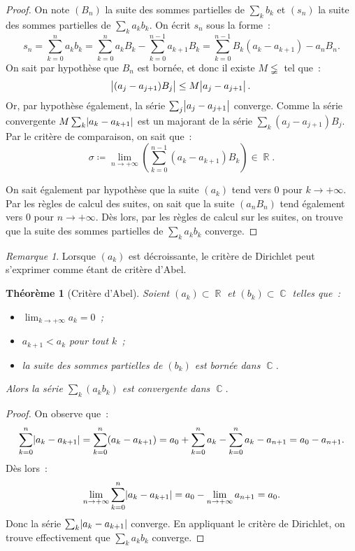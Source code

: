 \documentclass{article}
\DeclareMathOperator{\C}{\mathbb C}
\DeclareMathOperator{\R}{\mathbb R}
\newtheorem{thm}{Théorème}[section]
\theoremstyle{definition}
\theoremstyle{remark}
\newtheorem*{rmq}{Remarque}
\begin{document}
		\begin{proof} On note $(B_n)$ la suite des sommes partielles de $\sum_k b_k$ et $(s_n)$ la suite des sommes partielles de $\sum_k a_kb_k$.
		On écrit $s_n$ sous la forme~:
		\[s_n = \sum_{k=0}^na_kb_k = \sum_{k=0}^na_kB_k - \sum_{k=0}^{n-1}a_{k+1}B_k = \sum_{k=0}^{n-1}B_k(a_k-a_{k+1}) - a_nB_n.\]
		On sait par hypothèse que $B_n$ est bornée, et donc il existe $M \lneqq $ tel que~:
		\[\abs {(a_j-a_{j+1})B_j} \leq M\abs{a_j-a_{j+1}}.\]
		Or, par hypothèse également, la série $\sum_j\abs{a_j-a_{j+1}}$ converge. Comme la série convergente $M\sum_k \abs {a_k-a_{k+1}}$ est un majorant de la
		série $\sum_k (a_j-a_{j+1})B_j$. Par le critère de comparaison, on sait que~:
		\[\sigma \coloneqq \lim_{n \to +\infty}\left(\sum_{k=0}^{n-1}(a_k - a_{k+1})B_k\right) \in \R.\]

		On sait également par hypothèse que la suite $(a_k)$ tend vers 0 pour $k \to +\infty$. Par les règles de calcul des suites, on sait que la suite
		$(a_nB_n)$ tend également vers 0 pour $n \to +\infty$. Dès lors, par les règles de calcul sur les suites, on trouve que la suite des sommes partielles de
		$\sum_k a_kb_k$ converge.
		\end{proof}

		\begin{rmq} Lorsque $(a_k)$ est décroissante, le critère de Dirichlet peut s'exprimer comme étant de critère d'Abel. \end{rmq}

		\begin{thm}[Critère d'Abel] Soient $(a_k) \subset \R$ et $(b_k) \subset \C$ telles que~:
		\begin{itemize}
			\item[$(i)$]   $\lim_{k \to +\infty} a_k = 0$~;
			\item[$(ii)$]  $a_{k+1} < a_k$ pour tout $k$~;
			\item[$(iii)$] la suite des sommes partielles de $(b_k)$ est bornée dans $\C$.
		\end{itemize}
		Alors la série $\sum_k (a_kb_k)$ est convergente dans $\C$.
		\end{thm}

		\begin{proof} On observe que~:
		\[\sum_{k=0}^n \abs{a_k-a_{k+1}} = \sum_{k=0}^n (a_k-a_{k+1}) = a_0 + \sum_{k=0}^n a_k - \sum_{k=0}^n a_k - a_{n+1} = a_0 - a_{n+1}.\]
		Dès lors~:
		\[\lim_{n \to +\infty}\sum_{k=0}^n\abs{a_k - a_{k+1}} = a_0 - \lim_{n \to +\infty}a_{n+1} = a_0.\]
		Donc la série $\sum_k\abs{a_k-a_{k+1}}$ converge. En appliquant le critère de Dirichlet, on trouve effectivement que $\sum_k a_kb_k$ converge.
		\end{proof}
\end{document}
